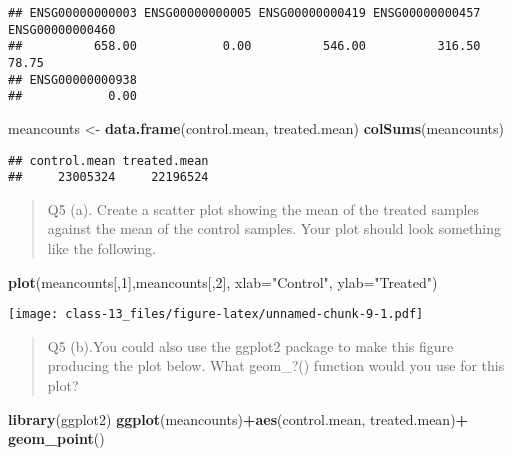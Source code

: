 \documentclass[
]{article}
\newenvironment{Shaded}{\begin{snugshade}}{\end{snugshade}}
\newcommand{\AttributeTok}[1]{\textcolor[rgb]{0.13,0.29,0.53}{#1}}
\newcommand{\DecValTok}[1]{\textcolor[rgb]{0.00,0.00,0.81}{#1}}
\newcommand{\FunctionTok}[1]{\textcolor[rgb]{0.13,0.29,0.53}{\textbf{#1}}}
\newcommand{\NormalTok}[1]{#1}
\newcommand{\OtherTok}[1]{\textcolor[rgb]{0.56,0.35,0.01}{#1}}
\newcommand{\SpecialCharTok}[1]{\textcolor[rgb]{0.81,0.36,0.00}{\textbf{#1}}}
\newcommand{\StringTok}[1]{\textcolor[rgb]{0.31,0.60,0.02}{#1}}
\begin{document}
\begin{verbatim}
## ENSG00000000003 ENSG00000000005 ENSG00000000419 ENSG00000000457 ENSG00000000460 
##          658.00            0.00          546.00          316.50           78.75 
## ENSG00000000938 
##            0.00
\end{verbatim}

\begin{Shaded}
\begin{Highlighting}[]
\NormalTok{meancounts }\OtherTok{\textless{}{-}} \FunctionTok{data.frame}\NormalTok{(control.mean, treated.mean)}
\FunctionTok{colSums}\NormalTok{(meancounts)}
\end{Highlighting}
\end{Shaded}

\begin{verbatim}
## control.mean treated.mean 
##     23005324     22196524
\end{verbatim}

\begin{quote}
Q5 (a). Create a scatter plot showing the mean of the treated samples
against the mean of the control samples. Your plot should look something
like the following.
\end{quote}

\begin{Shaded}
\begin{Highlighting}[]
\FunctionTok{plot}\NormalTok{(meancounts[,}\DecValTok{1}\NormalTok{],meancounts[,}\DecValTok{2}\NormalTok{], }\AttributeTok{xlab=}\StringTok{"Control"}\NormalTok{, }\AttributeTok{ylab=}\StringTok{"Treated"}\NormalTok{)}
\end{Highlighting}
\end{Shaded}

\texttt{[image: class-13\_files/figure-latex/unnamed-chunk-9-1.pdf]}

\begin{quote}
Q5 (b).You could also use the ggplot2 package to make this figure
producing the plot below. What geom\_?() function would you use for this
plot?
\end{quote}

\begin{Shaded}
\begin{Highlighting}[]
\FunctionTok{library}\NormalTok{(ggplot2)}
\FunctionTok{ggplot}\NormalTok{(meancounts)}\SpecialCharTok{+}\FunctionTok{aes}\NormalTok{(control.mean, treated.mean)}\SpecialCharTok{+}
  \FunctionTok{geom\_point}\NormalTok{()}
\end{Highlighting}
\end{Shaded}
\end{document}
